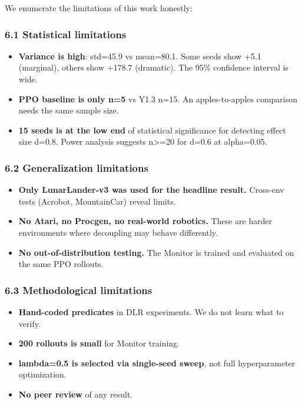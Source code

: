 \documentclass[
]{article}
\providecommand{\tightlist}{%
  \setlength{\itemsep}{0pt}\setlength{\parskip}{0pt}}
\begin{document}
We enumerate the limitations of this work honestly:

\subsubsection{6.1 Statistical
limitations}\label{statistical-limitations}

\begin{itemize}
\tightlist
\item
  \textbf{Variance is high}: std=45.9 vs mean=80.1. Some seeds show +5.1
  (marginal), others show +178.7 (dramatic). The 95\% confidence
  interval is wide.
\item
  \textbf{PPO baseline is only n=5} vs Y1.3 n=15. An apples-to-apples
  comparison needs the same sample size.
\item
  \textbf{15 seeds is at the low end} of statistical significance for
  detecting effect size d=0.8. Power analysis suggests n\textgreater=20
  for d=0.6 at alpha=0.05.
\end{itemize}

\subsubsection{6.2 Generalization
limitations}\label{generalization-limitations}

\begin{itemize}
\tightlist
\item
  \textbf{Only LunarLander-v3 was used for the headline result.}
  Cross-env tests (Acrobot, MountainCar) reveal limits.
\item
  \textbf{No Atari, no Procgen, no real-world robotics.} These are
  harder environments where decoupling may behave differently.
\item
  \textbf{No out-of-distribution testing.} The Monitor is trained and
  evaluated on the same PPO rollouts.
\end{itemize}

\subsubsection{6.3 Methodological
limitations}\label{methodological-limitations}

\begin{itemize}
\tightlist
\item
  \textbf{Hand-coded predicates} in DLR experiments. We do not learn
  what to verify.
\item
  \textbf{200 rollouts is small} for Monitor training.
\item
  \textbf{lambda=0.5 is selected via single-seed sweep}, not full
  hyperparameter optimization.
\item
  \textbf{No peer review} of any result.
\end{itemize}
\end{document}
